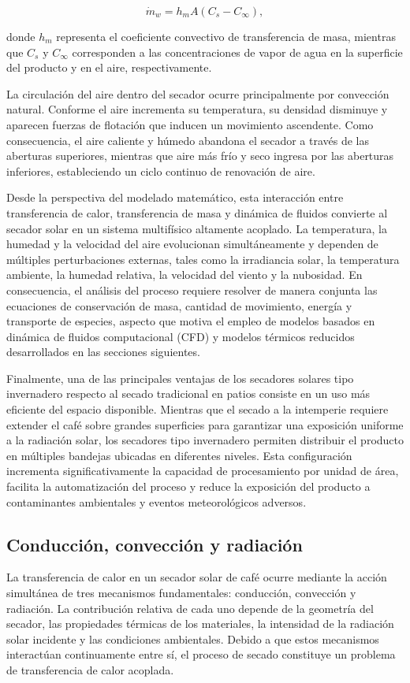\begin{equation}
\dot m_w=h_mA\left(C_s-C_\infty\right),
\end{equation}

donde $h_m$ representa el coeficiente convectivo de transferencia de masa, mientras que $C_s$ y $C_\infty$ corresponden a las concentraciones de vapor de agua en la superficie del producto y en el aire, respectivamente.

La circulación del aire dentro del secador ocurre principalmente por convección natural. Conforme el aire incrementa su temperatura, su densidad disminuye y aparecen fuerzas de flotación que inducen un movimiento ascendente. Como consecuencia, el aire caliente y húmedo abandona el secador a través de las aberturas superiores, mientras que aire más frío y seco ingresa por las aberturas inferiores, estableciendo un ciclo continuo de renovación de aire.

Desde la perspectiva del modelado matemático, esta interacción entre transferencia de calor, transferencia de masa y dinámica de fluidos convierte al secador solar en un sistema multifísico altamente acoplado. La temperatura, la humedad y la velocidad del aire evolucionan simultáneamente y dependen de múltiples perturbaciones externas, tales como la irradiancia solar, la temperatura ambiente, la humedad relativa, la velocidad del viento y la nubosidad. En consecuencia, el análisis del proceso requiere resolver de manera conjunta las ecuaciones de conservación de masa, cantidad de movimiento, energía y transporte de especies, aspecto que motiva el empleo de modelos basados en dinámica de fluidos computacional (CFD) y modelos térmicos reducidos desarrollados en las secciones siguientes.

Finalmente, una de las principales ventajas de los secadores solares tipo invernadero respecto al secado tradicional en patios consiste en un uso más eficiente del espacio disponible. Mientras que el secado a la intemperie requiere extender el café sobre grandes superficies para garantizar una exposición uniforme a la radiación solar, los secadores tipo invernadero permiten distribuir el producto en múltiples bandejas ubicadas en diferentes niveles. Esta configuración incrementa significativamente la capacidad de procesamiento por unidad de área, facilita la automatización del proceso y reduce la exposición del producto a contaminantes ambientales y eventos meteorológicos adversos.


\subsection{Conducción, convección y radiación}
La transferencia de calor en un secador solar de café ocurre mediante la acción simultánea de tres mecanismos fundamentales: conducción, convección y radiación. La contribución relativa de cada uno depende de la geometría del secador, las propiedades térmicas de los materiales, la intensidad de la radiación solar incidente y las condiciones ambientales. Debido a que estos mecanismos interactúan continuamente entre sí, el proceso de secado constituye un problema de transferencia de calor acoplada.

